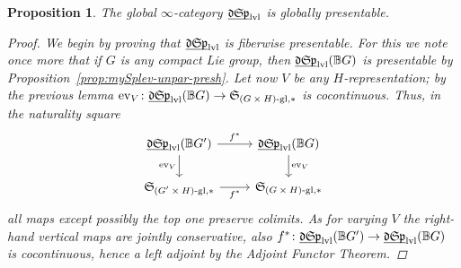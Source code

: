 \documentclass[reqno]{memo-l}
\theoremstyle{mythm}
\newtheorem{prop}[thm]{Proposition}
\theoremstyle{definition}
\numberwithin{equation}{section}
\DeclareMathOperator{\ev}{ev}
\newcommand{\BGcat}[1]{\mathbb B{#1}}
\newcommand{\ulhelper}[2]{\underline{\setbox0=\hbox{$#1#2$}\dp0=0.4pt \box0\relax}}
\newcommand{\ul}[1]{{\mathpalette\ulhelper{#1}}\hbox{\rule[-2pt]{0pt}{0pt}}}
\newcommand{\mySp}{{\mathfrak S\kern-.5pt\mathfrak p}}
\newcommand{\myLSp}{{\mathfrak d\kern-.25pt}\mySp}
\newcommand{\ulmySplev}{\ul{\myLSp}_\textup{lvl}}
\newcommand{\myS}{{{\mathfrak S\kern-.4pt}}}
\begin{document}
\begin{prop}\label{prop:Splev-cc}
    The global $\infty$-category $\ulmySplev$ is globally presentable.
    \begin{proof}
        We begin by proving that $\ulmySplev$ is fiberwise presentable. For this we note once more that if $G$ is any compact Lie group, then $\ulmySplev(\BGcat{G})$ is presentable by Proposition~\ref{prop:mySplev-unpar-presh}. Let now $V$ be any $H$-representation; by the previous lemma $\ev_V\colon\ulmySplev(\BGcat{G})\to\myS_{\textup{$(G\times H)$-gl},*}$ is cocontinuous. Thus, in the naturality square
        \[
            \begin{tikzcd}
                \ulmySplev(\BGcat{G'})\arrow[d,"\ev_V"']\arrow[r,"f^*"] & \ulmySplev(\BGcat{G})\arrow[d,"\ev_V"]\\
                \myS_{\text{$(G'\times H)$-gl},*}\arrow[r,"f^*"'] & \myS_{\text{$(G\times H)$-gl},*} 
            \end{tikzcd}
        \]
        all maps except possibly the top one preserve colimits. As for varying $V$ the right-hand vertical maps are jointly conservative, also $f^*\colon\ulmySplev(\BGcat{G'})\to\ulmySplev(\BGcat{G})$ is cocontinuous, hence a left adjoint by the Adjoint Functor Theorem.
        

\end{proof}
\end{prop}
\end{document}
